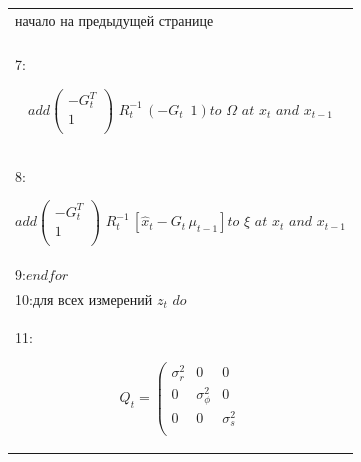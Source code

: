 \documentclass[10pt,a4paper]{article}
\begin{document}
\begin{table}[H]
\begin{center}
\begin{tabular}{|l|}
\hline
\end{tabular}
\end{center}
\end{table}

\begin{table}[H]
\begin{center}
\begin{tabular}{|l|}
\hline
\hspace{50mm}$\boxed{\textit{начало на предыдущей странице}}$\\
{}\\
7:\hspace{10mm}
\begin{minipage}{0.2\textwidth}
\begin{equation*}
\textit{add}	\left(\begin{array}{c}
-G_t^T\\
1\\
\end{array}\right)
\,\,R_t^{-1}\,(-G_t\,\,\,1)\textit{to}\,\,\varOmega\,\,\textit{at}\,\,x_t\,\,\textit{and}\,\,x_{t-1}			\end{equation*}
\end{minipage}\\
8:\hspace{10mm}
\begin{minipage}{0.2\textwidth}
\begin{equation*}
\textit{add}	\left(\begin{array}{c}
-G_t^T\\
1\\
\end{array}\right)
\,\,R_t^{-1}\,[\hat{x}_t-G_t\,\mu_{t-1}]\textit{to}\,\,\xi\,\,\textit{at}\,\,x_t\,\,\textit{and}\,\,x_{t-1}		\end{equation*}
\end{minipage}\\
9:\hspace{6mm}$\textit{endfor}$\\
10:\hspace{4mm}$\textit{для всех измерений}\,\,z_t\,\,\textit{do}$\\
11:\hspace{4mm}
\begin{minipage}{0.2\textwidth}
\begin{equation*}
Q_t=	\left(\begin{array}{ccc}
\sigma_r^2&0&0\\
0&\sigma_\phi^2&0\\
0&0&\sigma_s^2\\

\end{array}
\end{equation*}
\end{minipage}
\end{tabular}
\end{center}
\end{table}
\end{document}
